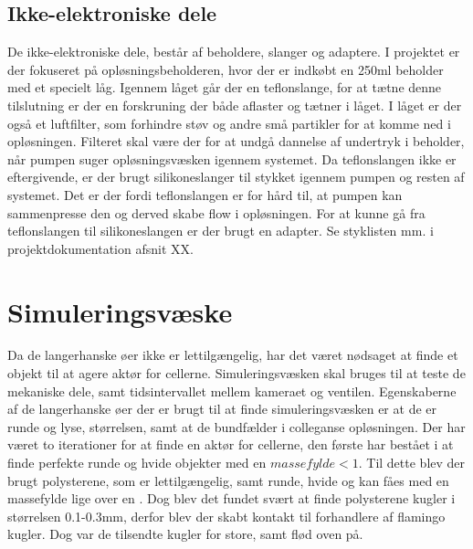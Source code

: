 \subsection{Ikke-elektroniske dele}
De ikke-elektroniske dele, består af beholdere, slanger og adaptere. I projektet er der fokuseret på opløsningsbeholderen, hvor der er indkøbt en 250ml beholder med et specielt låg. Igennem låget går der en teflonslange, for at tætne denne tilslutning er der en forskruning der både aflaster og tætner i låget. I låget er der også et luftfilter, som forhindre støv og andre små partikler for at komme ned i opløsningen. Filteret skal være der for at undgå dannelse af undertryk i beholder, når pumpen suger opløsningsvæsken igennem systemet. Da teflonslangen ikke er eftergivende, er der brugt silikoneslanger til stykket igennem pumpen og resten af systemet. Det er der fordi teflonslangen er for hård til, at pumpen kan sammenpresse den og derved skabe flow i opløsningen. For at kunne gå fra teflonslangen til silikoneslangen er der brugt en adapter. Se styklisten mm. i projektdokumentation afsnit XX.



\section{Simuleringsvæske}
\label{sec:simuleringsv}
Da de langerhanske øer ikke er lettilgængelig, har det været nødsaget at finde et objekt til at agere aktør for cellerne. Simuleringsvæsken skal bruges til at teste de mekaniske dele, samt tidsintervallet mellem kameraet og ventilen. Egenskaberne af de langerhanske øer der er brugt til at finde simuleringsvæsken er at de er runde og lyse, størrelsen, samt at de bundfælder i colleganse opløsningen. Der har været to iterationer for at finde en aktør for cellerne, den første har bestået i at finde perfekte runde og hvide objekter med en $massefylde<1$. Til dette blev der brugt polysterene, som er lettilgængelig, samt runde, hvide og kan fåes med en massefylde lige over en . Dog blev det fundet svært at finde polysterene kugler i størrelsen 0.1-0.3mm, derfor blev der skabt kontakt til forhandlere af flamingo kugler. Dog var de tilsendte kugler for store, samt flød oven på. 

